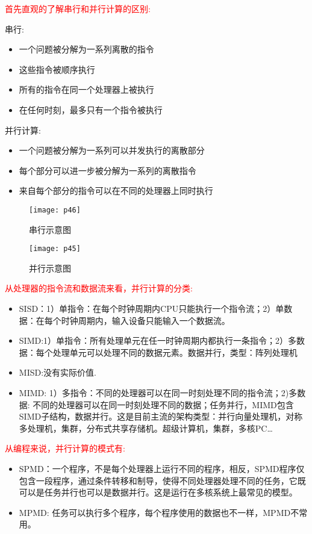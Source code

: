 \documentclass[utf8]{book}
\begin{document}
	\textcolor{red}{首先直观的了解串行和并行计算的区别:}
	\begin{multicols}{2}
	串行:
	\begin{itemize}
		\item 一个问题被分解为一系列离散的指令
		\item 这些指令被顺序执行
		\item 所有的指令在同一个处理器上被执行
		\item 在任何时刻，最多只有一个指令被执行
	\end{itemize}


	并行计算:
	\begin{itemize}
		\item 一个问题被分解为一系列可以并发执行的离散部分
		\item 每个部分可以进一步被分解为一系列的离散指令
		\item 来自每个部分的指令可以在不同的处理器上同时执行
	\end{itemize}

	\begin{figure}[H]
	\centering
	\texttt{[image: p46]}
	\caption{串行示意图}
	\end{figure}

	\begin{figure}[H]
		\centering
		\texttt{[image: p45]}
		\caption{并行示意图}
	\end{figure}
	

	\textcolor{red}{从处理器的指令流和数据流来看，并行计算的分类:}
	\begin{itemize}
		\item SISD：1）单指令：在每个时钟周期内CPU只能执行一个指令流；2）单数据：在每个时钟周期内，输入设备只能输入一个数据流。
		\item SIMD:1）单指令：所有处理单元在任一时钟周期内都执行一条指令；2）多数据：每个处理单元可以处理不同的数据元素。数据并行，类型：阵列处理机
		\item MISD:没有实际价值.
		\item MIMD: 1）多指令：不同的处理器可以在同一时刻处理不同的指令流；2)多数据: 不同的处理器可以在同一时刻处理不同的数据；任务并行，MIMD包含SIMD子结构，数据并行。这是目前主流的架构类型：并行向量处理机，对称多处理机，集群，分布式共享存储机。超级计算机，集群，多核PC…
	\end{itemize}

	\textcolor{red}{从编程来说，并行计算的模式有:}
	\begin{itemize}
		\item SPMD：一个程序，不是每个处理器上运行不同的程序，相反，SPMD程序仅包含一段程序，通过条件转移和制导，使得不同处理器处理不同的任务，它既可以是任务并行也可以是数据并行。这是运行在多核系统上最常见的模型。
		\item MPMD: 任务可以执行多个程序，每个程序使用的数据也不一样，MPMD不常用。
	\end{itemize}
	\end{multicols}
\end{document}
